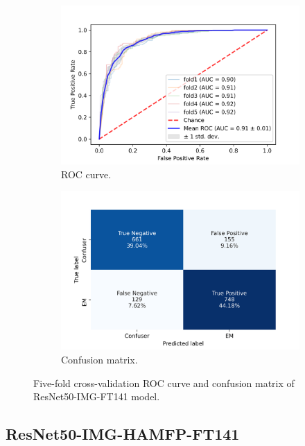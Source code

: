 \begin{figure}[h!]
	\centering
	\begin{subfigure}[b]{0.49\textwidth}
		\centering
		\includegraphics[width=\textwidth,keepaspectratio]{images/Supplement4/image56.png}
		\caption{ROC curve.}
	\end{subfigure}
	\hfill
	\begin{subfigure}[b]{0.49\textwidth}
		\centering
		\includegraphics[width=\textwidth,keepaspectratio]{images/Supplement4/image61.png}
		\caption{Confusion matrix.}
	\end{subfigure}
	\caption{Five-fold cross-validation ROC curve and confusion matrix of ResNet50-IMG-FT141 model.}
\end{figure}

\vfill\clearpage
\subsection{ResNet50-IMG-HAMFP-FT141}

